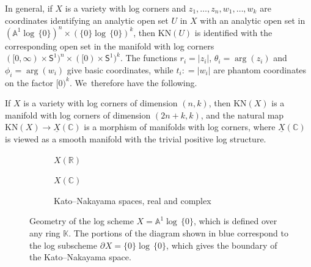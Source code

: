 \documentclass[JEP,XML,SOM,Unicode,NoFloatCountersInSection,published]{cedram}
\theoremstyle{definition}
\theoremstyle{remark}
\newcommand{\CC}{\mathbb{C}}
\newcommand{\KK}{\mathbb{K}}
\newcommand{\RR}{\mathbb{R}}
\newcommand{\AF}{\mathbb{A}}
\newcommand{\halfspc}[1]{[0,\infty)^{#1}}
\newcommand{\logcyl}{\AF^1 \log\, \{0\}}
\newcommand{\logcirc}{\{0\} \log\, \{0\}}
\newcommand{\defas}{\mathrel{\mathop:}=}
\newcommand{\bdX}[1][]{\partial^{#1} X}
\newcommand{\uX}{\underline{X}}
\newcommand{\KN}[1]{\mathrm{KN}(#1)}
\newcommand{\unitcirc}{\mathsf{S}^{1}}
\begin{document}
In general, if $X$ is a variety with log corners and $z_1,\ldots,z_n,w_1,\ldots,w_k$ are coordinates identifying an analytic open set $U$ in $X$ with an analytic open set in $(\logcyl)^n\times(\logcirc)^k$, then $\KN{U}$ is identified with the corresponding open set in the manifold with log corners $(\halfspc{} \times \unitcirc)^n \times ([0)\times\unitcirc)^k$. The functions $r_i = |z_i|$, $\theta_i = \arg(z_i)$ and $\phi_i = \arg(w_i)$ give basic coordinates, while $t_i \defas |w_i|$ are phantom coordinates on the factor $[0)^k$. We~therefore have the following.

\begin{proposition}
If $X$ is a variety with log corners of dimension $(n,k)$, then $\KN{X}$ is a manifold with log corners of dimension $(2n+k,k)$, and the natural map $\KN{X} \to \uX(\CC)$ is a morphism of manifolds with log corners, where $\uX(\CC)$ is viewed as a smooth manifold with the trivial positive log structure.
\end{proposition}

\begin{figure}
\centering
\begin{subfigure}[t]{.32\linewidth}
\centering{}
\caption{$X(\RR)$}
\end{subfigure}
\hfill
\begin{subfigure}[t]{.32\linewidth}
\centering
{}
\caption{$X(\CC)$}
\end{subfigure}
\hfill
\begin{subfigure}[t]{.32\linewidth}
\centering
{}
\caption{Kato--Nakayama spaces, real and complex}\label{fig:a1-real-KN-log-corner}
\end{subfigure}
\caption{Geometry of the log scheme $X = \logcyl$, which is defined over any ring $\KK$. The portions of the diagram shown in blue correspond to the log subscheme $\bdX = \logcirc$, which gives the boundary of the Kato--Nakayama space.}\label{fig:a1-real-KN}
\label{fig:enter-label}
\end{figure}
\end{document}

